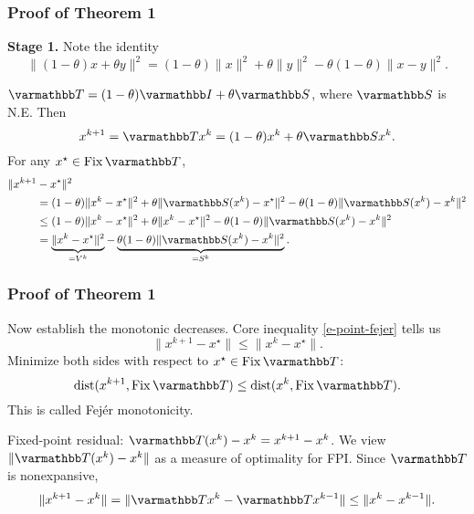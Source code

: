 \documentclass[10pt,mathserif]{beamer}
\begin{document}
\begin{frame}
\frametitle{Proof of Theorem 1}
\textbf{Stage 1.}
Note the identity
\[
\| (1-\theta) x + \theta y \|^2 = (1-\theta) \|x\|^2 +
\theta \|y\|^2 - \theta(1-\theta) \|x-y\|^2.
\]

$\opT =(1-\theta)\opI+\theta \opS$, where $\opS$ is N.E.
Then
\[
x^{k+1}=\opT x^k=(1-\theta)x^k+\theta \opS x^k.
\]
For any $x^\star \in \fix \opT $,
\begin{align}
\|x^{k+1}& - x^\star\|^2 \nonumber\\&=
(1-\theta) \|x^k - x^\star\|^2 +
\theta \|\opS (x^k) - x^\star \|^2 - \theta(1-\theta)
\|\opS (x^k)-x^k\|^2\nonumber\\
&\leq
(1-\theta) \|x^k - x^\star\|^2 +
\theta \|x^k - x^\star \|^2 - \theta(1-\theta)
\|\opS (x^k)-x^k\|^2\nonumber\\
&=
\underbrace{\|x^k - x^\star\|^2}_{=V^k} -
\underbrace{\theta(1-\theta) \|\opS (x^k)-x^k\|^2}_{=S^k}.
\label{e-point-fejer}
\end{align}
\end{frame}

\begin{frame}
\frametitle{Proof of Theorem 1}
Now establish the monotonic decreases.
Core inequality \eqref{e-point-fejer} tells us
\[
\|x^{k+1}-x^\star\|\le \|x^{k}-x^\star\|.
\]
Minimize both sides with respect to $x^\star\in \fix \opT $:
\[
\dist(x^{k+1},\fix \opT )\le  \dist(x^k,\fix \opT ).
\]
This is called Fej\'er monotonicity.

\vspace{0.2in}


Fixed-point residual: $\opT (x^k)-x^k=x^{k+1}-x^k$.
We view $\|\opT (x^k)-x^k\|$ as a measure of optimality for FPI.
Since $\opT $ is nonexpansive,
\[
\|x^{k+1}-x^k\|= \|\opT x^{k}-\opT x^{k-1}\|\le \|x^{k}-x^{k-1}\|.
\]
\end{frame}
\end{document}
